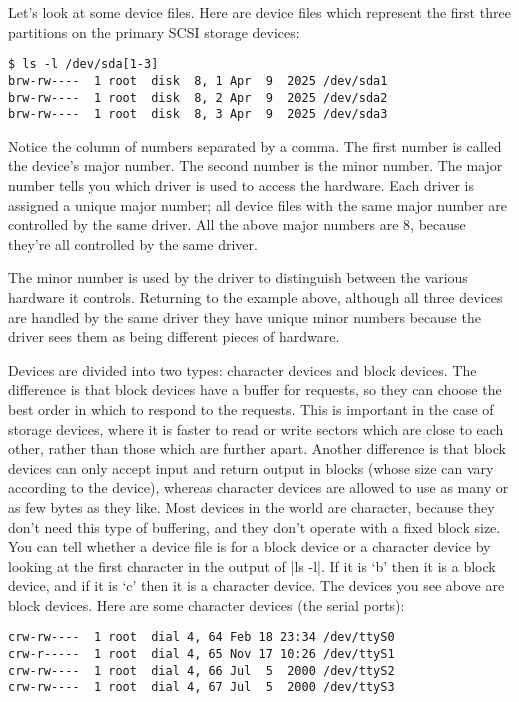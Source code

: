 \documentclass[10pt, oneside]{book}
\begin{document}
Let's look at some device files.
Here are device files which represent the first three partitions on the primary SCSI storage devices:

\begin{verbatim}
$ ls -l /dev/sda[1-3]
brw-rw----  1 root  disk  8, 1 Apr  9  2025 /dev/sda1
brw-rw----  1 root  disk  8, 2 Apr  9  2025 /dev/sda2
brw-rw----  1 root  disk  8, 3 Apr  9  2025 /dev/sda3
\end{verbatim}

Notice the column of numbers separated by a comma.
The first number is called the device's major number.
The second number is the minor number.
The major number tells you which driver is used to access the hardware.
Each driver is assigned a unique major number; all device files with the same major number are controlled by the same driver.
All the above major numbers are 8, because they're all controlled by the same driver.

The minor number is used by the driver to distinguish between the various hardware it controls.
Returning to the example above, although all three devices are handled by the same driver they have unique minor numbers because the driver sees them as being different pieces of hardware.

Devices are divided into two types: character devices and block devices.
The difference is that block devices have a buffer for requests, so they can choose the best order in which to respond to the requests.
This is important in the case of storage devices, where it is faster to read or write sectors which are close to each other, rather than those which are further apart.
Another difference is that block devices can only accept input and return output in blocks (whose size can vary according to the device), whereas character devices are allowed to use as many or as few bytes as they like.
Most devices in the world are character, because they don't need this type of buffering, and they don't operate with a fixed block size.
You can tell whether a device file is for a block device or a character device by looking at the first character in the output of \sh|ls -l|.
If it is `b' then it is a block device, and if it is `c' then it is a character device.
The devices you see above are block devices. Here are some character devices (the serial ports):

\begin{verbatim}
crw-rw----  1 root  dial 4, 64 Feb 18 23:34 /dev/ttyS0
crw-r-----  1 root  dial 4, 65 Nov 17 10:26 /dev/ttyS1
crw-rw----  1 root  dial 4, 66 Jul  5  2000 /dev/ttyS2
crw-rw----  1 root  dial 4, 67 Jul  5  2000 /dev/ttyS3
\end{verbatim}
\end{document}
